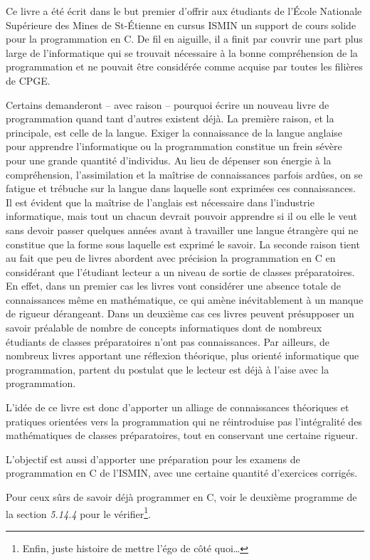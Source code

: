 \documentclass[../main.tex]{subfiles}
\begin{document}
Ce livre a été écrit dans le but premier d'offrir aux étudiants de l'École Nationale Supérieure des
Mines de St-Étienne en cursus ISMIN un support de cours solide pour la programmation en C. De fil
en aiguille, il a finit par couvrir une part plus large de l'informatique qui se trouvait nécessaire à la
bonne compréhension de la programmation et ne pouvait être considérée comme acquise par toutes les
filières de CPGE.

Certains demanderont -- avec raison -- pourquoi écrire un nouveau livre de programmation quand tant d'autres existent déjà. La première raison, et la principale, est celle de la langue. Exiger la connaissance de la langue anglaise pour apprendre l'informatique ou la programmation constitue un frein sévère pour une grande quantité d'individus. Au lieu de dépenser son énergie à la compréhension, l'assimilation et la maîtrise de connaissances parfois ardûes, on se fatigue et trébuche sur la langue dans laquelle sont exprimées ces connaissances. Il est évident que la maîtrise de l'anglais est nécessaire dans l'industrie informatique, mais tout un chacun devrait pouvoir apprendre si il ou elle le veut sans devoir passer quelques années avant à travailler une langue étrangère qui ne constitue que la forme sous laquelle est exprimé le savoir. La seconde raison tient au fait que peu de livres abordent avec précision la programmation en C en considérant que l'étudiant lecteur a un niveau de sortie de classes préparatoires. En effet, dans un premier cas les livres vont considérer une absence totale de connaissances même en mathématique, ce qui amène inévitablement à un manque de rigueur dérangeant. Dans un deuxième cas ces livres peuvent présupposer un savoir préalable de nombre de concepts informatiques dont de nombreux étudiants de classes préparatoires n'ont pas connaissances. Par ailleurs, de nombreux livres apportant une réflexion théorique, plus orienté informatique que programmation, partent du postulat que le lecteur est déjà à l'aise avec la programmation.

L'idée de ce livre est donc d'apporter un alliage de connaissances théoriques et pratiques orientées vers la programmation qui ne réintroduise pas l'intégralité des mathématiques de classes préparatoires, tout en conservant une certaine rigueur.

L'objectif est aussi d'apporter une préparation pour les examens de programmation en C de l'ISMIN, avec une certaine quantité d'exercices corrigés.

Pour ceux sûrs de savoir déjà programmer en C, voir le deuxième programme de la section \textit{5.14.4} pour le vérifier\footnote{Enfin, juste histoire de mettre l'égo de côté quoi\dots}.
\end{document}
